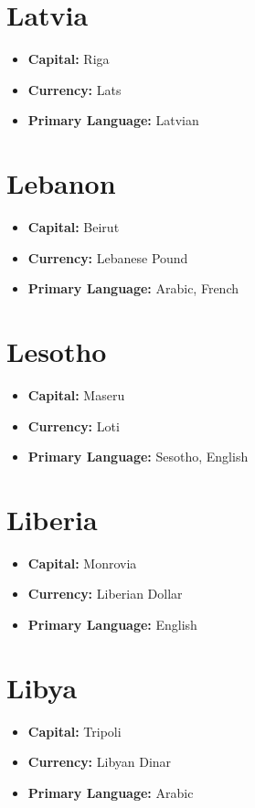\documentclass[a4paper,100pt,twoside]{book}
\begin{document}
\section*{\Huge Latvia}
\vspace{5mm} %
\begin{itemize}
	\item \textbf{Capital:} Riga
	\item \textbf{Currency:} Lats
	\item \textbf{Primary Language:} Latvian
\end{itemize}

\section*{\Huge Lebanon}
\vspace{5mm} %
\begin{itemize}
	\item \textbf{Capital:} Beirut
	\item \textbf{Currency:} Lebanese Pound
	\item \textbf{Primary Language:} Arabic, French
\end{itemize}

\section*{\Huge Lesotho}
\vspace{5mm} %
\begin{itemize}
	\item \textbf{Capital:} Maseru
	\item \textbf{Currency:} Loti
	\item \textbf{Primary Language:} Sesotho, English
\end{itemize}

\section*{\Huge Liberia}
\vspace{5mm} %
\begin{itemize}
	\item \textbf{Capital:} Monrovia
	\item \textbf{Currency:} Liberian Dollar
	\item \textbf{Primary Language:} English
\end{itemize}

\section*{\Huge Libya}
\vspace{5mm} %
\begin{itemize}
	\item \textbf{Capital:} Tripoli
	\item \textbf{Currency:} Libyan Dinar
	\item \textbf{Primary Language:} Arabic
\end{itemize}
\end{document}
